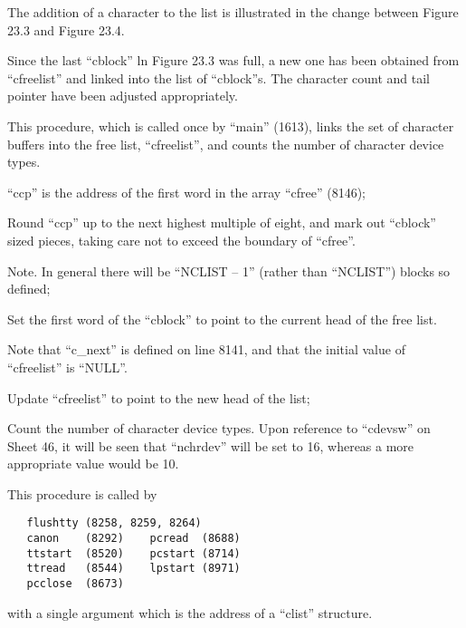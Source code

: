 The addition of a character to the list
is illustrated in the change between
Figure 23.3  and Figure 23.4.



Since the last ``cblock'' ln Figure 23.3
was full, a new one has been obtained
from ``cfreelist'' and linked into the
list of ``cblock''s. The character count
and tail pointer have been adjusted appropriately.


This procedure, which is called once by
``main'' (1613), links the set of character buffers into the free list,
``cfreelist'', and counts the number of
character device types.

\bd
\item[8239:] ``ccp'' is the address of the first
word in the array ``cfree'' (8146);

\item[8240:] Round ``ccp'' up to the next
highest multiple of eight, and
mark out ``cblock'' sized pieces,
taking care not to exceed the
boundary of ``cfree''.

Note. In general there will be
``NCLIST -- 1'' (rather than
``NCLIST'') blocks so defined;

\item[8241:] Set the first word of the
``cblock'' to point to the current
head of the free list.

Note that ``c\_next'' is defined on
line 8141, and that the initial
value of ``cfreelist'' is ``NULL''.

\item[8242:] Update ``cfreelist'' to point to
the new head of the list;

\item[8244:] Count the number of character
device types. Upon reference to
``cdevsw'' on Sheet 46, it will be
seen that ``nchrdev'' will be set
to 16, whereas a more appropriate
value would be 10.
\ed


This procedure is called by

\begin{verbatim}
   flushtty (8258, 8259, 8264)
   canon    (8292)    pcread  (8688)
   ttstart  (8520)    pcstart (8714)
   ttread   (8544)    lpstart (8971)
   pcclose  (8673)
\end{verbatim}

\noindent with a single argument which is the
address of a ``clist'' structure.

